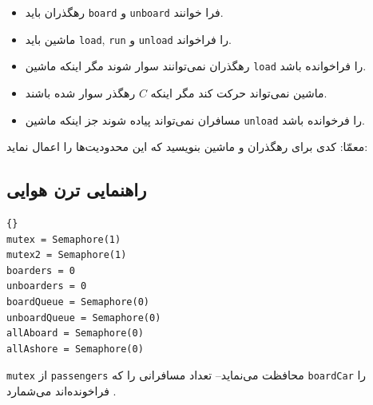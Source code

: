 \documentclass{book}
\newcommand{\clearemptydoublepage}{\newpage\cleardoublepage}
\begin{document}
\begin{itemize}

\item %
    رهگذران باید {\tt board} و {\tt unboard} فرا خوانند. 

\item %
    ماشین باید {\tt load}, {\tt run} و {\tt unload} را فراخواند. 

\item %
    رهگذران نمی‌توانند سوار شوند مگر اینکه ماشین {\tt load} را فراخوانده باشد. 

\item %
    ماشین نمی‌تواند حرکت کند مگر اینکه $C$ رهگذر سوار شده باشند. 

\item %
    مسافران نمی‌تواند پیاده شوند جز اینکه ماشین {\tt unload} را فرخوانده باشد. 

\end{itemize}

    معمّا: کدی برای رهگذران و ماشین بنویسید که این محدودیت‌ها را اعمال نماید:


\clearemptydoublepage
\subsection{راهنمایی ترن هوایی}

\begin{latin}
\begin{lstlisting}[title=\rl{راهنمایی ترن هوایی}]{}
mutex = Semaphore(1)
mutex2 = Semaphore(1)
boarders = 0
unboarders = 0
boardQueue = Semaphore(0)
unboardQueue = Semaphore(0)
allAboard = Semaphore(0)
allAshore = Semaphore(0)
\end{lstlisting}
\end{latin}

    {\tt mutex} از {\tt passengers} محافظت می‌نماید--
    تعداد  مسافرانی را که {\tt boardCar} را فراخونده‌اند می‌شمارد . 
\end{document}
